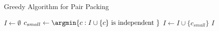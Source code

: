 \begin{frame}{Greedy Algorithm for Pair Packing}


\begin{algorithm}[H]
\begin{algorithmic}[1]

\STATE $I \gets \emptyset$
\STATE $c_{small} \gets \argmin\{c : I \cup \{c\} \text{ is independent }\}$
\STATE $I \gets I \cup \{ c_{small} \}$
\ENDWHILE
\RETURN $I$


\end{algorithmic}
\caption{Greedy Algorithm}
\end{algorithm}


\end{frame}